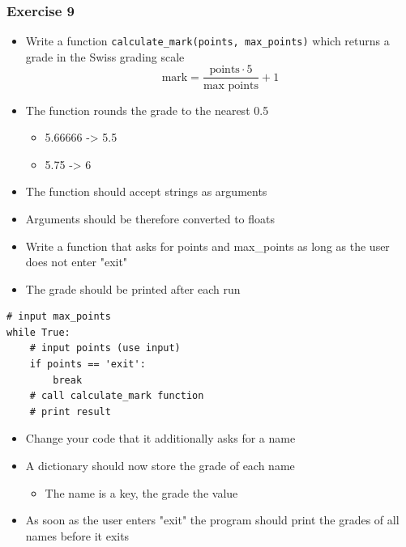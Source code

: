 \documentclass[10pt, a4paper]{beamer} %
\begin{document}
{\begin{frame}[c, fragile]
\end{frame}

\begin{frame}\frametitle{Exercise 9}
    
\begin{itemize}
    \item Write a function \texttt{calculate\_mark(points, max\_points)} which returns a grade in the Swiss grading scale
    \[ \text{mark} = \frac{\text{points}\cdot 5}{\text{max points}} + 1 \]
    \item The function rounds the grade to the nearest 0.5
    \begin{itemize}
        \item 5.66666 -> 5.5
        \item 5.75 -> 6
    \end{itemize}
    \item The function should accept strings as arguments
    \item Arguments should be therefore converted to floats
\end{itemize}

\framebreak

\begin{itemize}
    \item Write a function that asks for points and max\_points as long as the user does not enter "exit"
    \item The grade should be printed after each run
\end{itemize}

{
\mdseries
{}
\begin{lstlisting}
# input max_points
while True:
    # input points (use input)
    if points == 'exit':
        break
    # call calculate_mark function
    # print result
\end{lstlisting}
}
\framebreak

\begin{itemize}
    \item Change your code that it additionally asks for a name
    \item A dictionary should now store the grade of each name
    \begin{itemize}
        \item The name is a key, the grade the value
    \end{itemize}
    \item As soon as the user enters "exit" the program should print the grades of all names before it exits
\end{itemize}


\end{frame}}
\end{document}
